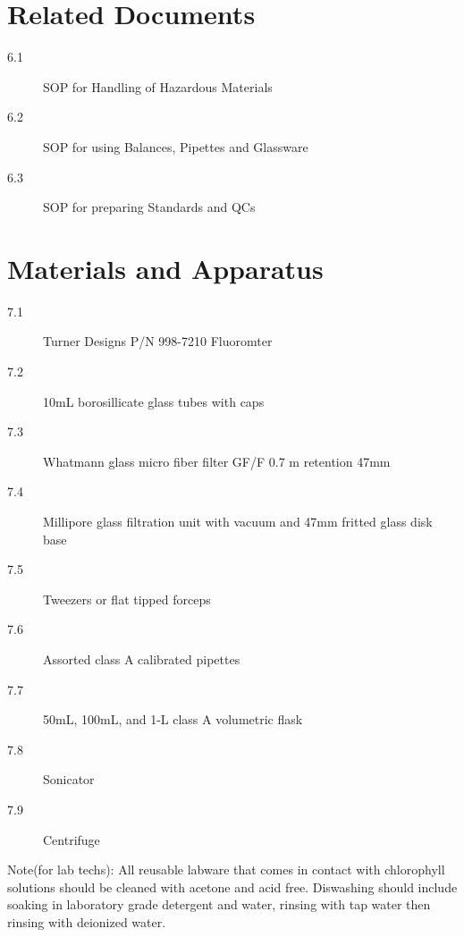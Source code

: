 \documentclass[12pt]{../SOP2}
\begin{document}
\section{Related Documents}
\begin{description}
\item[6.1] SOP for Handling of Hazardous Materials
\item[6.2] SOP for using Balances, Pipettes and Glassware
\item[6.3] SOP for preparing Standards and QCs %
\end{description}

\section{Materials and Apparatus}
\begin{description}
\item[7.1] Turner Designs P/N 998-7210 Fluoromter
\item[7.2] 10mL borosillicate glass tubes with caps
\item[7.3] Whatmann glass micro fiber filter GF/F 0.7 \micro m retention 47mm
\item[7.4] Millipore glass filtration unit with vacuum and 47mm fritted glass disk base
\item[7.5] Tweezers or flat tipped forceps
\item[7.6] Assorted class A calibrated pipettes
\item[7.7] 50mL, 100mL, and 1-L class A volumetric flask
\item[7.8] Sonicator %
\item[7.9] Centrifuge %
\end{description}

Note(for lab techs): All reusable labware that comes in contact with chlorophyll solutions should be cleaned with acetone and acid free. Diswashing should include soaking in laboratory grade detergent and water, rinsing with tap water then rinsing with deionized water. 
\end{document}
